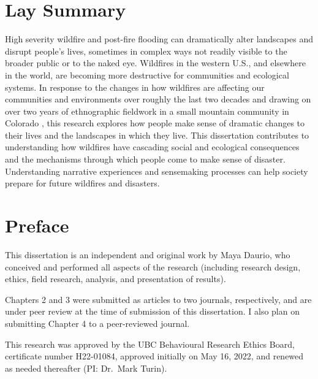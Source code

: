 \documentclass[
]{article}
\begin{document}
\clearpage

\section*{Lay Summary}

High severity wildfire and post-fire flooding can dramatically alter landscapes and disrupt people's lives, sometimes in complex ways not readily visible to the broader public or to the naked eye. Wildfires in the western U.S., and elsewhere in the world, are becoming more destructive for communities and ecological systems. In response to the changes in how wildfires are affecting our communities and environments over roughly the last two decades and drawing on over two years of ethnographic fieldwork in a small mountain community in Colorado , this research explores how people make sense of dramatic changes to their lives and the landscapes in which they live. This dissertation contributes to understanding how wildfires have cascading social and ecological consequences and the mechanisms through which people come to make sense of disaster. Understanding narrative experiences and sensemaking processes can help society prepare for future wildfires and disasters.

\clearpage

\section*{Preface}

This dissertation is an independent and original work by Maya Daurio, who conceived and
performed all aspects of the research (including research design, ethics, field research, analysis,
and presentation of results).

Chapters 2 and 3 were submitted as articles to two journals, respectively, and are under peer review at the time of submission of this dissertation. I also plan on submitting Chapter 4 to a peer-reviewed journal.

This research was approved by the UBC Behavioural Research Ethics Board, certificate number H22-01084, approved initially on May 16, 2022, and renewed as needed thereafter (PI: Dr.~Mark Turin).

\clearpage


\renewcommand*\contentsname{Table of Contents}
\end{document}
